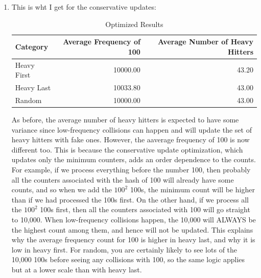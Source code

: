 \documentclass[12pt]{article}
\theoremstyle{definitionstyle}
\begin{document}
\begin{enumerate}[leftmargin=\labelsep]
\begin{enumerate}[label=(\alph*)]
            \newpage
            \item This is wht I get for the conservative updates:
            \begin{table}[h!]
                \centering
                \begin{tabular}{lrr}
                \toprule
                Category & Average Frequency of 100 & Average Number of Heavy Hitters \\
                \midrule
                Heavy First & 10000.00 & 43.20 \\
                Heavy Last  & 10033.80 & 43.00 \\
                Random      & 10000.00 & 43.00 \\
                \bottomrule
                \end{tabular}
                \caption{Optimized Results}
            \end{table}

            As before, the average number of heavy hitters is expected to have some variance since low-frequency collisions can happen and will update the set of heavy hitters with fake ones. However, the aaverage frequency of 100 is now different too. This is because the conservative update optimization, which updates only the minimum counters, adds an order dependence to the counts. For example, if we process everything before the number 100, then probably all the counters associated with the hash of 100 will already have some counts, and so when we add the $100^2$ 100s, the minimum count will be higher than if we had processed the 100s first. On the other hand, if we process all the $100^2$ 100s first, then all the counters associated with 100 will go straight to 10,000. When low-frequency collisions happen, the 10,000 will ALWAYS be the highest count among them, and hence will not be updated. This explains why the average frequency count for 100 is higher in heavy last, and why it is low in heavy first. For random, you are certainly likely to see lots of the 10,000 100s before seeing any collisions with 100, so the same logic applies but at a lower scale than with heavy last.
        \end{enumerate}
    \end{enumerate}
\end{document}
